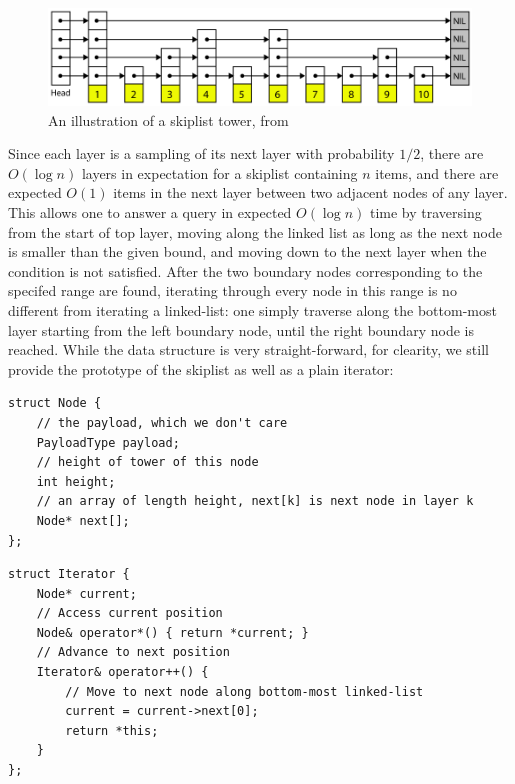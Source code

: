 \documentclass[11pt, usletter]{article}
\begin{document}
\begin{figure}[!htb]
  \includegraphics[width=\linewidth]{skiplistTower.png}
\caption{An illustration of a skiplist tower, from \cite{memsqladamblog}}
\label{skiplist_tower}
\end{figure}

Since each layer is a sampling of its next layer with probability $1/2$, 
there are $O(\log n)$ layers in expectation for a skiplist containing $n$ items, 
and there are expected $O(1)$ items in the next layer between two adjacent nodes of any layer. 
This allows one to answer a \lowerbound query in expected $O(\log n)$ time by traversing from the start of top layer, 
moving along the linked list as long as the next node is smaller than the given bound, 
and moving down to the next layer when the condition is not satisfied. 
After the two boundary nodes corresponding to the specifed range are found, 
iterating through every node in this range is no different from iterating a linked-list: 
one simply traverse along the bottom-most layer starting from the left boundary node, until the right boundary node is reached.
While the data structure is very straight-forward, for clearity, 
we still provide the prototype of the skiplist as well as a plain iterator:

\singlespacing\begin{codebox}
\begin{verbatim}
struct Node {
    // the payload, which we don't care
    PayloadType payload;
    // height of tower of this node 
    int height;	
    // an array of length height, next[k] is next node in layer k
    Node* next[]; 
};
\end{verbatim}
\end{codebox}\doublespacing

\singlespacing\begin{codebox}
\begin{verbatim}
struct Iterator {
    Node* current;
    // Access current position
    Node& operator*() { return *current; }
    // Advance to next position
    Iterator& operator++() { 
        // Move to next node along bottom-most linked-list 
        current = current->next[0]; 
        return *this;
    }
};
\end{verbatim}
\end{codebox}\doublespacing
\end{document}
